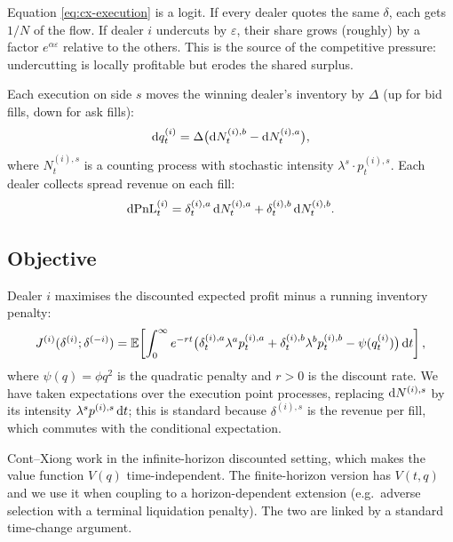 \begin{intuition}
Equation \eqref{eq:cx-execution} is a logit. If every dealer quotes the same $\delta$, each gets $1/N$ of the flow. If dealer $i$ undercuts by $\varepsilon$, their share grows (roughly) by a factor $e^{\alpha \varepsilon}$ relative to the others. This is the source of the competitive pressure: undercutting is locally profitable but erodes the shared surplus.
\end{intuition}

Each execution on side $s$ moves the winning dealer's inventory by $\Delta$ (up for bid fills, down for ask fills):
\begin{equation}
  \mathrm{d} q^{(i)}_t = \Delta \bigl(\mathrm{d} N^{(i), b}_t - \mathrm{d} N^{(i), a}_t\bigr),
\end{equation}
where $N^{(i), s}_t$ is a counting process with stochastic intensity $\lambda^s \cdot p^{(i), s}_t$. Each dealer collects spread revenue on each fill:
\begin{equation}
  \mathrm{d} \mathrm{PnL}^{(i)}_t = \delta^{(i), a}_t \, \mathrm{d} N^{(i), a}_t + \delta^{(i), b}_t \, \mathrm{d} N^{(i), b}_t.
\end{equation}

\subsection{Objective}

Dealer $i$ maximises the discounted expected profit minus a running inventory penalty:
\begin{equation}
  J^{(i)}(\delta^{(i)}; \delta^{(-i)}) = \mathbb{E}\!\left[\int_0^\infty e^{-r t} \bigl(\delta^{(i), a}_t \lambda^a p^{(i), a}_t + \delta^{(i), b}_t \lambda^b p^{(i), b}_t - \psi(q^{(i)}_t)\bigr) \, \mathrm{d} t\right],
  \label{eq:cx-objective}
\end{equation}
where $\psi(q) = \phi q^2$ is the quadratic penalty and $r > 0$ is the discount rate. We have taken expectations over the execution point processes, replacing $\mathrm{d} N^{(i), s}$ by its intensity $\lambda^s p^{(i), s} \, \mathrm{d} t$; this is standard because $\delta^{(i), s}$ is the revenue per fill, which commutes with the conditional expectation.

\begin{remark}
Cont--Xiong work in the infinite-horizon discounted setting, which makes the value function $V(q)$ time-independent. The finite-horizon version has $V(t, q)$ and we use it when coupling to a horizon-dependent extension (e.g.\ adverse selection with a terminal liquidation penalty). The two are linked by a standard time-change argument.
\end{remark}

